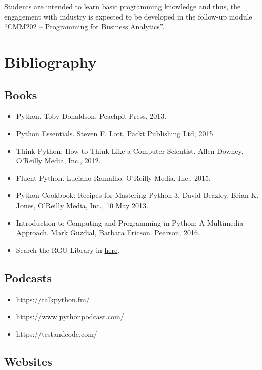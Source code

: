 \documentclass[11pt]{article}
\providecommand{\tightlist}{%
      \setlength{\itemsep}{0pt}\setlength{\parskip}{0pt}}
\begin{document}
Students are intended to learn basic programming knowledge and thus, the
engagement with industry is expected to be developed in the follow-up
module ``CMM202 -- Programming for Business Analytics''.

    \section{Bibliography}\label{bibliography}

    \subsection{Books}\label{books}

\begin{itemize}
\tightlist
\item
  Python. Toby Donaldson, Peachpit Press, 2013.
\item
  Python Essentials. Steven F. Lott, Packt Publishing Ltd, 2015.
\item
  Think Python: How to Think Like a Computer Scientist. Allen Downey,
  O'Reilly Media, Inc., 2012.
\item
  Fluent Python. Luciano Ramalho. O'Reilly Media, Inc., 2015.
\item
  Python Cookbook: Recipes for Mastering Python 3. David Beazley, Brian
  K. Jones, O'Reilly Media, Inc., 10 May 2013.
\item
  Introduction to Computing and Programming in Python: A Multimedia
  Approach. Mark Guzdial, Barbara Ericson. Pearson, 2016.
\item
  Search the RGU Library in
  \href{https://librarysearch.rgu.ac.uk/discovery/search?query=any,contains,python\&tab=Everything\&search_scope=MyInst_and_CI\&vid=44RGU_INST:VU1\&offset=0}{here}.
\end{itemize}

    \subsection{Podcasts}\label{podcasts}

\begin{itemize}
\tightlist
\item
  https://talkpython.fm/
\item
  https://www.pythonpodcast.com/
\item
  https://testandcode.com/
\end{itemize}

    \subsection{Websites}\label{websites}
\end{document}
